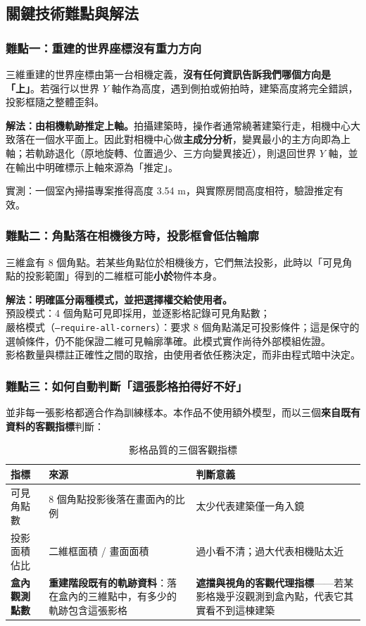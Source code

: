 \documentclass[11pt,a4paper,fontset=windows]{ctexart}
\newcommand{\key}[1]{\textbf{\color{ink}#1}}
\begin{document}
\subsection{關鍵技術難點與解法}

\subsubsection*{難點一：重建的世界座標沒有重力方向}

三維重建的世界座標由第一台相機定義，\textbf{沒有任何資訊告訴我們哪個方向是「上」}。若强行以世界 $Y$ 軸作為高度，遇到側拍或俯拍時，建築高度將完全錯誤，投影框隨之整體歪斜。

\key{解法：由相機軌跡推定上軸。}拍攝建築時，操作者通常繞著建築行走，相機中心大致落在一個水平面上。因此對相機中心做\textbf{主成分分析}，變異最小的主方向即為上軸；若軌跡退化（原地旋轉、位置過少、三方向變異接近），則退回世界 $Y$ 軸，並在輸出中明確標示上軸來源為「推定」。

實測：一個室內掃描專案推得高度 3.54 m，與實際房間高度相符，驗證推定有效。

\subsubsection*{難點二：角點落在相機後方時，投影框會低估輪廓}

三維盒有 8 個角點。若某些角點位於相機後方，它們無法投影，此時以「可見角點的投影範圍」得到的二維框可能\textbf{小於}物件本身。

\key{解法：明確區分兩種模式，並把選擇權交給使用者。}\\
預設模式：4 個角點可見即採用，並逐影格記錄可見角點數；\\
嚴格模式（\texttt{--require-all-corners}）：要求 8 個角點滿足可投影條件；這是保守的選幀條件，仍不能保證二維可見輪廓準確。此模式實作尚待外部模組佐證。\\
影格數量與標註正確性之間的取捨，由使用者依任務決定，而非由程式暗中決定。

\subsubsection*{難點三：如何自動判斷「這張影格拍得好不好」}
\label{sec:quality}

並非每一張影格都適合作為訓練樣本。本作品不使用額外模型，而以三個\textbf{來自既有資料的客觀指標}判斷：

\begin{table}[H]
\centering
\small
\caption{影格品質的三個客觀指標}
\begin{tabular}{p{3.0cm}p{4.4cm}p{6.4cm}}
\toprule
\textbf{指標} & \textbf{來源} & \textbf{判斷意義} \\
\midrule
可見角點數 & 8 個角點投影後落在畫面內的比例 & 太少代表建築僅一角入鏡 \\
投影面積佔比 & 二維框面積 / 畫面面積 & 過小看不清；過大代表相機貼太近 \\
\key{盒內觀測點數} & \textbf{重建階段既有的軌跡資料}：落在盒內的三維點中，有多少的軌跡包含這張影格 & \textbf{遮擋與視角的客觀代理指標}——若某影格幾乎沒觀測到盒內點，代表它其實看不到這棟建築 \\
\bottomrule
\end{tabular}
\end{table}
\end{document}
